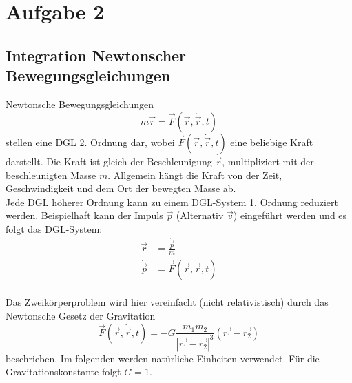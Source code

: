 \section{Aufgabe 2}
\label{sec:A2}

\subsection{Integration Newtonscher Bewegungsgleichungen}
Newtonsche Bewegungsgleichungen
\begin{equation}
    m \ddot{\vec{r}} = \vec{F}(\vec{r}, \dot{\vec{r}}, t)
\end{equation}
stellen eine DGL 2. Ordnung dar, wobei $\vec{F}(\vec{r}, \dot{\vec{r}}, t)$ eine beliebige Kraft darstellt.
Die Kraft ist gleich der Beschleunigung $\ddot{\vec{r}}$, multipliziert mit der beschleunigten Masse $m$.
Allgemein hängt die Kraft von der Zeit, Geschwindigkeit und dem Ort der bewegten Masse ab.
\\
Jede DGL höherer Ordnung kann zu einem DGL-System 1. Ordnung reduziert werden.
Beispielhaft kann der Impuls $\vec{p}$ (Alternativ $\vec{v}$) eingeführt werden und es folgt das DGL-System:
\begin{align}
    \dot{\vec{r}} &= \frac{\dot{\vec{p}}}{m} \\
    \dot{\vec{p}} &= \vec{F}(\vec{r}, \dot{\vec{r}}, t)
\end{align}
\\
Das Zweikörperproblem wird hier vereinfacht (nicht relativistisch) durch das Newtonsche Gesetz der Gravitation
\begin{equation}
   \vec{F}(\vec{r}, \dot{\vec{r}}, t) = - G \frac{m_1 m_2}{|\vec{r_1} - \vec{r_2}|^3} (\vec{r_1} - \vec{r_2})
\end{equation}
beschrieben.
Im folgenden werden natürliche Einheiten verwendet.
Für die Gravitationskonstante folgt $G = 1$.

